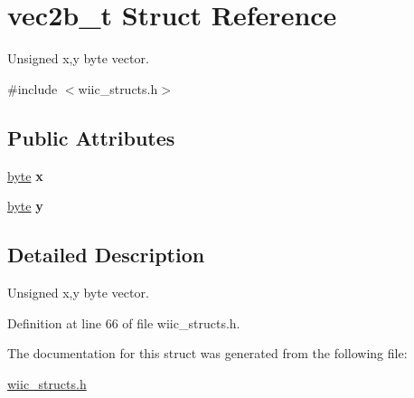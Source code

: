 \hypertarget{structvec2b__t}{\section{vec2b\-\_\-t \-Struct \-Reference}
\label{structvec2b__t}
}


\-Unsigned x,y byte vector.  




{\ttfamily \#include $<$wiic\-\_\-structs.\-h$>$}

\subsection*{\-Public \-Attributes}
\begin{DoxyCompactItemize}
\item 
\hypertarget{structvec2b__t_a770aacd26e2799bccfecd8eeb4f16092}{\hyperlink{wiic__macros_8h_a0c8186d9b9b7880309c27230bbb5e69d}{byte} {\bfseries x}}\label{structvec2b__t_a770aacd26e2799bccfecd8eeb4f16092}

\item 
\hypertarget{structvec2b__t_ad69850e7b8fd19a9cb69431d5dbfab83}{\hyperlink{wiic__macros_8h_a0c8186d9b9b7880309c27230bbb5e69d}{byte} {\bfseries y}}\label{structvec2b__t_ad69850e7b8fd19a9cb69431d5dbfab83}

\end{DoxyCompactItemize}


\subsection{\-Detailed \-Description}
\-Unsigned x,y byte vector. 

\-Definition at line 66 of file wiic\-\_\-structs.\-h.



\-The documentation for this struct was generated from the following file\-:\begin{DoxyCompactItemize}
\item 
\hyperlink{wiic__structs_8h}{wiic\-\_\-structs.\-h}\end{DoxyCompactItemize}
